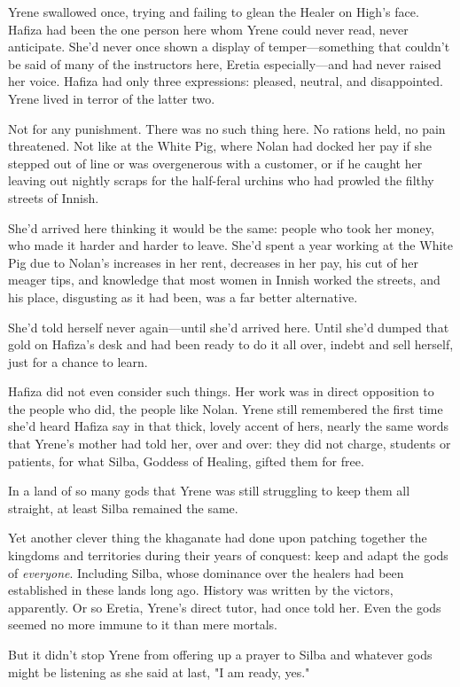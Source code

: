Yrene swallowed once, trying and failing to glean the Healer on High's face. Hafiza had been the one person here whom Yrene could never read, never anticipate. She'd never once shown a display of temper---something that couldn't be said of many of the instructors here, Eretia especially---and had never raised her voice. Hafiza had only three expressions: pleased, neutral, and disappointed. Yrene lived in terror of the latter two.

Not for any punishment. There was no such thing here. No rations held, no pain threatened. Not like at the White Pig, where Nolan had docked her pay if she stepped out of line or was overgenerous with a customer, or if he caught her leaving out nightly scraps for the half-feral urchins who had prowled the filthy streets of Innish.

She'd arrived here thinking it would be the same: people who took her money, who made it harder and harder to leave. She'd spent a year working at the White Pig due to Nolan's increases in her rent, decreases in her pay, his cut of her meager tips, and knowledge that most women in Innish worked the streets, and his place, disgusting as it had been, was a far better alternative.

She'd told herself never again---until she'd arrived here. Until she'd dumped that gold on Hafiza's desk and had been ready to do it all over, indebt and sell herself, just for a chance to learn.

Hafiza did not even consider such things. Her work was in direct opposition to the people who did, the people like Nolan. Yrene still remembered the first time she'd heard Hafiza say in that thick, lovely accent of hers, nearly the same words that Yrene's mother had told her, over and over: they did not charge, students or patients, for what Silba, Goddess of Healing, gifted them for free.

In a land of so many gods that Yrene was still struggling to keep them all straight, at least Silba remained the same.

Yet another clever thing the khaganate had done upon patching together the kingdoms and territories during their years of conquest: keep and adapt the gods of \emph{everyone}. Including Silba, whose dominance over the healers had been established in these lands long ago. History was written by the victors, apparently. Or so Eretia, Yrene's direct tutor, had once told her. Even the gods seemed no more immune to it than mere mortals.

But it didn't stop Yrene from offering up a prayer to Silba and whatever gods might be listening as she said at last, "I am ready, yes."

